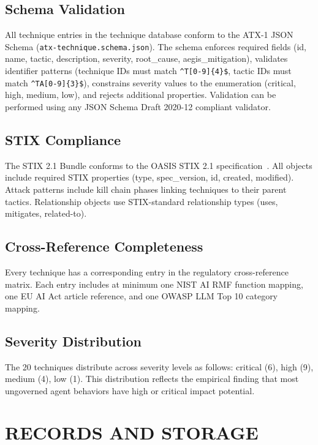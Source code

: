 \documentclass{IEEEoj-data}
\begin{document}
\subsection*{Schema Validation}

All technique entries in the technique database conform to the ATX-1 JSON Schema (\texttt{atx-technique.schema.json}). The schema enforces required fields (id, name, tactic, description, severity, root\_cause, aegis\_mitigation), validates identifier patterns (technique IDs must match \texttt{\^{}T[0-9]\{4\}\$}, tactic IDs must match \texttt{\^{}TA[0-9]\{3\}\$}), constrains severity values to the enumeration (critical, high, medium, low), and rejects additional properties. Validation can be performed using any JSON Schema Draft 2020-12 compliant validator.

\subsection*{STIX Compliance}

The STIX 2.1 Bundle conforms to the OASIS STIX 2.1 specification~\cite{ref7}. All objects include required STIX properties (type, spec\_version, id, created, modified). Attack patterns include kill chain phases linking techniques to their parent tactics. Relationship objects use STIX-standard relationship types (uses, mitigates, related-to).

\subsection*{Cross-Reference Completeness}

Every technique has a corresponding entry in the regulatory cross-reference matrix. Each entry includes at minimum one NIST AI RMF function mapping, one EU AI Act article reference, and one OWASP LLM Top 10 category mapping.

\subsection*{Severity Distribution}

The 20 techniques distribute across severity levels as follows: critical (6), high (9), medium (4), low (1). This distribution reflects the empirical finding that most ungoverned agent behaviors have high or critical impact potential.


\section*{RECORDS AND STORAGE}
\end{document}
